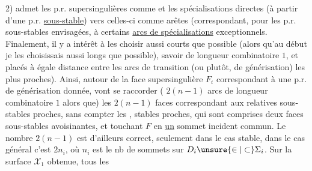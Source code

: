 2)  admet les p.r. supersingulières comme  et les spécialisations directes (à partir d'une p.r. \uline{sous-stable}) vers celles-ci comme arêtes (correspondant, pour les p.r. sous-stables envisagées, à certains \uline{arcs de spécialisations} exceptionnels.
Finalement, il y a intérêt à les choisir aussi courts que possible (alors qu'au début je les choisissais aussi longs que possible), savoir de longueur combinatoire $1$, et placés à égale distance entre les arcs de transition (ou plutôt, de générisation) les plus proches). Ainsi, autour de la face supersingulière $F_i$ correspondant à une p.r. de générisation donnée, vont se raccorder ( $2(n-1)$ arcs de longueur combinatoire $1$ alors que) les $2(n-1)$ faces correspondant aux  relatives sous-stables proches, sans compter les , stables proches, qui sont  comprises  deux faces sous-stables avoisinantes, et touchant $F$ en \uline{un} sommet incident commun. Le nombre $2(n-1)$ est d'ailleurs correct, seulement dans le cas stable, dans le cas général c'est $2n_i$, où $n_i$ est le nb de sommets sur $D_i\unsure{\in|\subset}\Sigma_i$. Sur la surface $\mathcal X_1$ obtenue, tous les

